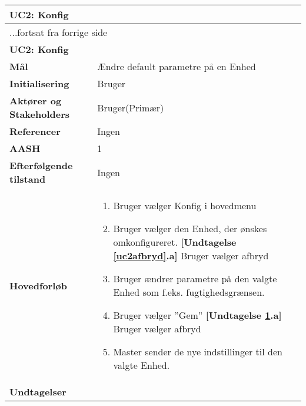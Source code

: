 \begin{center} \centering \label{UC2}
	\begin{longtable}{|p{5cm}|p{9cm}|}  %
	\hline
		\multicolumn{2}{|l|}{\textbf{UC2: Konfig}} \\\hline %
		\endfirsthead
		
		\multicolumn{2}{l}{...fortsat fra forrige side} \\ \hline %
		\multicolumn{2}{|l|}{\textbf{UC2: Konfig}} \\\hline %
		\endhead	
		
		\textbf{Mål}								&Ændre default parametre på en Enhed			\\\hline
		\textbf{Initialisering}					&Bruger							\\\hline
		\textbf{Aktører og Stakeholders}			&Bruger(Primær)					\\\hline
		\textbf{Referencer}						&Ingen							\\\hline
		\textbf{AASH}							&1								\\\hline
		\textbf{Efterfølgende tilstand}			&Ingen							\\\hline
		\textbf{Hovedforløb}					
			&\begin{enumerate}
	
				\item Bruger vælger Konfig i hovedmenu
				
				\item \label{uc2afbryd}Bruger vælger den Enhed, der ønskes omkonfigureret.\newline
				\textbf{[Undtagelse \ref{uc2afbryd}.a]} \newline
					Bruger vælger afbryd
				
				\item Bruger ændrer parametre på den valgte Enhed som f.eks. fugtighedsgrænsen.
				
				\item \label{uc2afbryd2} Bruger vælger ''Gem''\newline
				\textbf{[Undtagelse \ref{uc2afbryd2}.a]} \newline
					Bruger vælger afbryd
				
				\item Master sender de nye indstillinger til den valgte Enhed. 
	
			\end{enumerate}\\\hline
		\textbf{Undtagelser}
			&\begin{enumerate}[label=\ref{uc2afbryd}.a]
				

\end{enumerate}
\end{longtable}
\end{center}

